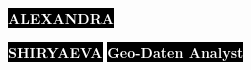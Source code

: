 \documentclass[11pt]{developercv} %
\title{\Title}
\begin{document}

\begin{minipage}[t]{0.39\textwidth} %
  \vspace{-\baselineskip} %
  \colorbox{black}{{\huge\textcolor{white}{\textbf{\MakeUppercase{Alexandra}}}}} %

  \colorbox{black}{{\huge\textcolor{white}{\textbf{\MakeUppercase{Shiryaeva}}}}} %
  \colorbox{black}{{\LARGE\textcolor{white}{\textbf{Geo-Daten Analyst}}}} %

  \raggedright{}
\end{minipage}
\begin{minipage}[t]{0.45\textwidth} %
  \vspace{-\baselineskip} %
  \\
  \\
  \\
\end{minipage}
\end{document}
